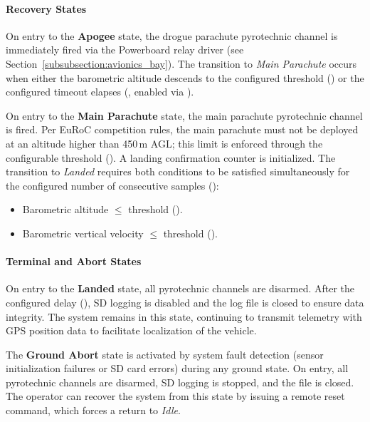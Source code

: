 \paragraph{Recovery States}

On entry to the \textbf{Apogee} state, the drogue parachute pyrotechnic channel is immediately fired via the Powerboard relay driver (see Section~\ref{subsubsection:avionics_bay}). The transition to \emph{Main Parachute} occurs when either the barometric altitude descends to the configured threshold () or the configured timeout elapses (, enabled via ).

On entry to the \textbf{Main Parachute} state, the main parachute pyrotechnic channel is fired. Per EuRoC competition rules, the main parachute must not be deployed at an altitude higher than 450\,m AGL; this limit is enforced through the configurable threshold (). A landing confirmation counter is initialized. The transition to \emph{Landed} requires both conditions to be satisfied simultaneously for the configured number of consecutive samples ():
\begin{itemize}
    \item Barometric altitude $\leq$ threshold ().
    \item Barometric vertical velocity $\leq$ threshold ().
\end{itemize}

\paragraph{Terminal and Abort States}

On entry to the \textbf{Landed} state, all pyrotechnic channels are disarmed. After the configured delay (), SD logging is disabled and the log file is closed to ensure data integrity. The system remains in this state, continuing to transmit telemetry with GPS position data to facilitate localization of the vehicle.

The \textbf{Ground Abort} state is activated by system fault detection (sensor initialization failures or SD card errors) during any ground state. On entry, all pyrotechnic channels are disarmed, SD logging is stopped, and the file is closed. The operator can recover the system from this state by issuing a remote reset command, which forces a return to \emph{Idle}.

